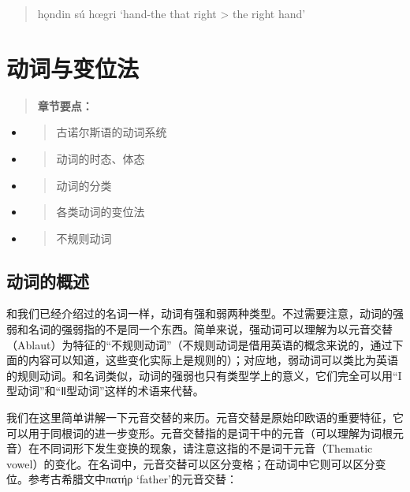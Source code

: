 \begin{quote}
  hǫndin sú hœgri `hand-the that right \textgreater{} the right hand'
\end{quote}

\section{动词与变位法}\label{ux52a8ux8bcdux4e0eux53d8ux4f4dux6cd5}

\begin{quote}
  \textbf{章节要点：}
\end{quote}

\begin{itemize}
  \item
        \begin{quote}
          古诺尔斯语的动词系统
        \end{quote}
  \item
        \begin{quote}
          动词的时态、体态
        \end{quote}
  \item
        \begin{quote}
          动词的分类
        \end{quote}
  \item
        \begin{quote}
          各类动词的变位法
        \end{quote}
  \item
        \begin{quote}
          不规则动词
        \end{quote}
\end{itemize}

\subsection{动词的概述}\label{ux52a8ux8bcdux7684ux6982ux8ff0}

和我们已经介绍过的名词一样，动词有强和弱两种类型。不过需要注意，动词的强弱和名词的强弱指的不是同一个东西。简单来说，强动词可以理解为以元音交替（Ablaut）为特征的``不规则动词''（不规则动词是借用英语的概念来说的，通过下面的内容可以知道，这些变化实际上是规则的）；对应地，弱动词可以类比为英语的规则动词。和名词类似，动词的强弱也只有类型学上的意义，它们完全可以用``I型动词''和``Ⅱ型动词''这样的术语来代替。

我们在这里简单讲解一下元音交替的来历。元音交替是原始印欧语的重要特征，它可以用于同根词的进一步变形。元音交替指的是词干中的元音（可以理解为词根元音）在不同词形下发生变换的现象，请注意这指的不是词干元音（Thematic
vowel）的变化。在名词中，元音交替可以区分变格；在动词中它则可以区分变位。参考古希腊文中πατήρ
`father'的元音交替：

